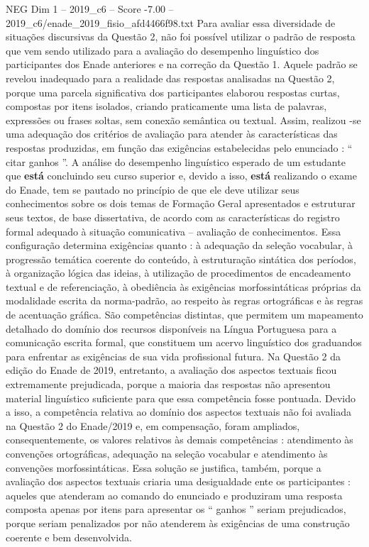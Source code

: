\begin{textsample}{NEG Dim 1 – 2019\_c6 – Score -7.00 – 2019\_c6/enade\_2019\_fisio\_afd4466f98.txt}
Para avaliar essa diversidade de situações discursivas da Questão 2, não foi possível utilizar o padrão de resposta que vem sendo utilizado para a avaliação do desempenho linguístico dos participantes dos Enade anteriores e na correção da Questão 1.
Aquele padrão se revelou inadequado para a realidade das respostas analisadas na Questão 2, porque uma parcela significativa dos participantes elaborou respostas curtas, compostas por itens isolados, criando praticamente uma lista de palavras, expressões ou frases soltas, sem conexão semântica ou textual.
Assim, realizou -se uma adequação dos critérios de avaliação para atender às características das respostas produzidas, em função das exigências estabelecidas pelo enunciado : “ citar ganhos ”.
A análise do desempenho linguístico esperado de um estudante que \textbf{está} concluindo seu curso superior e, devido a isso, \textbf{está} realizando o exame do Enade, tem se pautado no princípio de que ele deve utilizar seus conhecimentos sobre os dois temas de Formação Geral apresentados e estruturar seus textos, de base dissertativa, de acordo com as características do registro formal adequado à situação comunicativa – avaliação de conhecimentos.
Essa configuração determina exigências quanto : à adequação da seleção vocabular, à progressão temática coerente do conteúdo, à estruturação sintática dos períodos, à organização lógica das ideias, à utilização de procedimentos de encadeamento textual e de referenciação, à obediência às exigências morfossintáticas próprias da modalidade escrita da norma-padrão, ao respeito às regras ortográficas e às regras de acentuação gráfica.
São competências distintas, que permitem um mapeamento detalhado do domínio dos recursos disponíveis na Língua Portuguesa para a comunicação escrita formal, que constituem um acervo linguístico dos graduandos para enfrentar as exigências de sua vida profissional futura.
Na Questão 2 da edição do Enade de 2019, entretanto, a avaliação dos aspectos textuais ficou extremamente prejudicada, porque a maioria das respostas não apresentou material linguístico suficiente para que essa competência fosse pontuada.
Devido a isso, a competência relativa ao domínio dos aspectos textuais não foi avaliada na Questão 2 do Enade/2019 e, em compensação, foram ampliados, consequentemente, os valores relativos às demais competências : atendimento às convenções ortográficas, adequação na seleção vocabular e atendimento às convenções morfossintáticas.
Essa solução se justifica, também, porque a avaliação dos aspectos textuais criaria uma desigualdade ente os participantes : aqueles que atenderam ao comando do enunciado e produziram uma resposta composta apenas por itens para apresentar os “ ganhos ” seriam prejudicados, porque seriam penalizados por não atenderem às exigências de uma construção coerente e bem desenvolvida.

\end{textsample}
